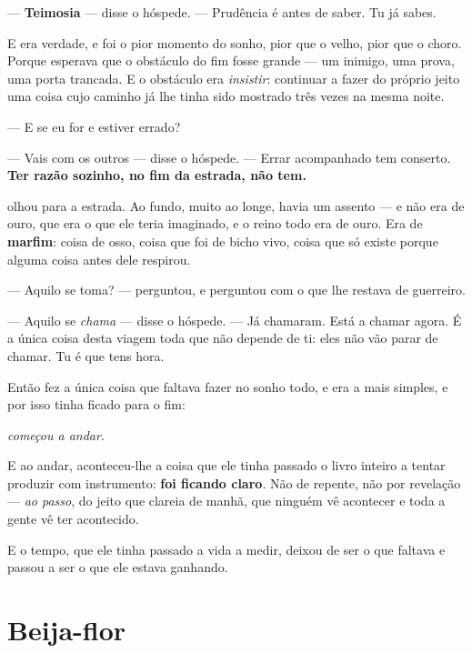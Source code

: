 \documentclass[livro.tex]{subfiles}
\begin{document}
--- \textbf{Teimosia} --- disse o hóspede. --- Prudência é antes de saber. Tu
já sabes.

\medskip
\noindent E era verdade, e foi o pior momento do sonho, pior que o velho, pior
que o choro. Porque \Ben esperava que o obstáculo do fim fosse grande ---
um inimigo, uma prova, uma porta trancada. E o obstáculo era \emph{insistir}:
continuar a fazer do próprio jeito uma coisa cujo caminho já lhe tinha sido
mostrado três vezes na mesma noite.

\medskip
\noindent --- E se eu for e estiver errado?

--- Vais com os outros --- disse o hóspede. --- Errar acompanhado tem
conserto. \textbf{Ter razão sozinho, no fim da estrada, não tem.}

\medskip
\noindent \Ben olhou para a estrada. Ao fundo, muito ao longe, havia um assento
--- e não era de ouro, que era o que ele teria imaginado, e o reino todo era de
ouro. Era de \textbf{marfim}: coisa de osso, coisa que foi de bicho vivo, coisa
que só existe porque alguma coisa antes dele respirou.

\medskip
\noindent --- Aquilo se toma? --- perguntou, e perguntou com o que lhe restava
de guerreiro.

--- Aquilo se \emph{chama} --- disse o hóspede. --- Já chamaram. Está a
chamar agora. É a única coisa desta viagem toda que não depende de ti: eles
não vão parar de chamar. Tu é que tens hora.

\medskip
\noindent Então \Ben fez a única coisa que faltava fazer no sonho todo, e era
a mais simples, e por isso tinha ficado para o fim:

\begin{center}
\emph{começou a andar.}
\end{center}

\noindent E ao andar, aconteceu-lhe a coisa que ele tinha passado o livro
inteiro a tentar produzir com instrumento: \textbf{foi ficando claro}. Não de
repente, não por revelação --- \emph{ao passo}, do jeito que clareia de manhã,
que ninguém vê acontecer e toda a gente vê ter acontecido.

\medskip
\noindent E o tempo, que ele tinha passado a vida a medir, deixou de ser o que
faltava e passou a ser o que ele estava ganhando.

\chapter{Beija-flor}
\end{document}
